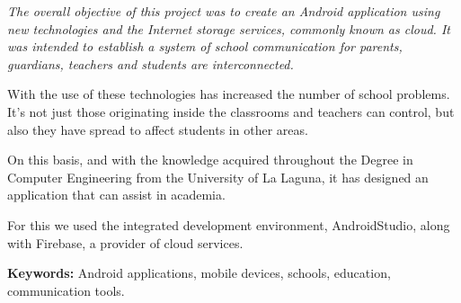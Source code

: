 %
%
%
%

\newpage  %
\begin{summary}
	{\em
		The overall objective of this project was to create an \textit{Android} application using new technologies and the Internet storage services, commonly known as cloud. It was intended to establish a system of school communication for parents, guardians, teachers and students are interconnected.
		
		\bigskip
		With the use of these technologies has increased the number of school problems. It's not just those originating inside the classrooms and teachers can control, but also they have spread to affect students in other areas.
		
		\bigskip
		On this basis, and with the knowledge acquired throughout the Degree in Computer Engineering from the University of La Laguna, it has designed an application that can assist in academia.
		
		\bigskip
		For this we used the integrated development environment, AndroidStudio, along with Firebase, a provider of cloud services.
		
		\bigskip
		{\bf Keywords:} Android applications, mobile devices, schools, education, communication tools.
	}
\end{summary}
